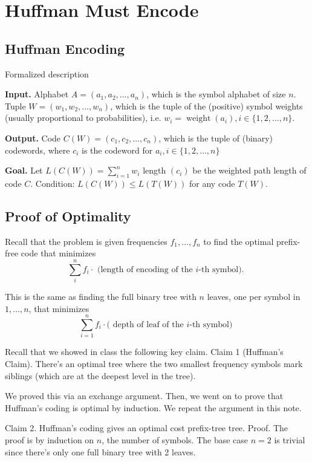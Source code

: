 \documentclass[scrartcl]{article}
\begin{document}
\section{Huffman Must Encode}
\subsection{Huffman Encoding}
Formalized description 

\textbf{Input.}
Alphabet $A=\left(a_1, a_2, \ldots, a_n\right)$, which is the symbol alphabet of size $n$.
Tuple $W=\left(w_1, w_2, \ldots, w_n\right)$, which is the tuple of the (positive) symbol weights (usually proportional to probabilities), i.e. $w_i=\operatorname{weight}\left(a_i\right), i \in\{1,2, \ldots, n\}$.

\textbf{Output.}
Code $C(W)=\left(c_1, c_2, \ldots, c_n\right)$, which is the tuple of (binary) codewords, where $c_i$ is the codeword for $a_i, i \in\{1,2, \ldots, n\}$

\textbf{Goal.}
Let $L(C(W))=\sum_{i=1}^n w_i$ length $\left(c_i\right)$ be the weighted path length of code $C$. Condition: $L(C(W)) \leq L(T(W))$ for any code $T(W)$.

\subsection{Proof of Optimality}
Recall that the problem is given frequencies $f_1, \ldots, f_n$ to find the optimal prefix-free code that minimizes
$$
\sum_i^n f_i \cdot \text { (length of encoding of the } i \text {-th symbol). }
$$

This is the same as finding the full binary tree with $n$ leaves, one per symbol in $1, \ldots, n$, that minimizes
$$
\sum_{i=1}^n f_i \cdot(\text { depth of leaf of the } i \text {-th symbol) }
$$

Recall that we showed in class the following key claim.
Claim 1 (Huffman's Claim). There's an optimal tree where the two smallest frequency symbols mark siblings (which are at the deepest level in the tree).

We proved this via an exchange argument. Then, we went on to prove that Huffman's coding is optimal by induction. We repeat the argument in this note.

Claim 2. Huffman's coding gives an optimal cost prefix-tree tree.
Proof. The proof is by induction on $n$, the number of symbols. The base case $n=2$ is trivial since there's only one full binary tree with 2 leaves.
\end{document}
